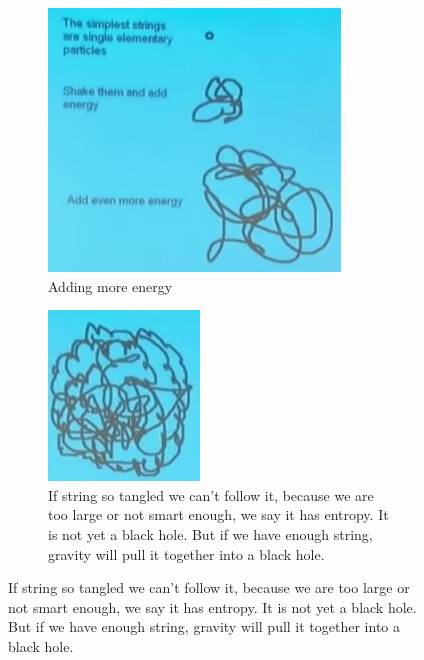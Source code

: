 \documentclass[]{article}
\begin{document}
\begin{figure}[H]
	\caption{String Theory is a theory where elementary particles are tiny pieces of string}
	\begin{subfigure}[t]{0.3\textwidth}
		\caption{Adding more energy}
		\includegraphics[width=\textwidth]{wh-strings}
	\end{subfigure}
	\;
	\begin{subfigure}[t]{0.3\textwidth}
		\caption{If string so tangled we can't follow it, because we are too large or not smart enough, we say it has entropy. It is not yet a black hole. But if we have enough string, gravity will pull it together into a black hole.}
		\includegraphics[width=\textwidth]{wh-string-tangle}

\end{subfigure}
\end{figure}
\end{document}
